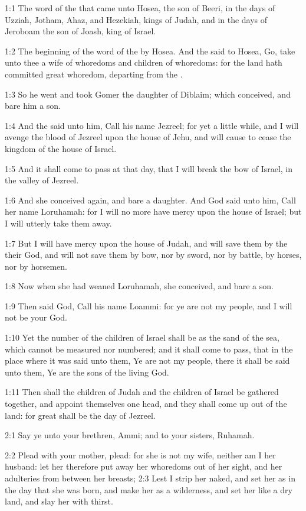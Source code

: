 

1:1 The word of the \LORD that came unto Hosea, the son of Beeri, in
the days of Uzziah, Jotham, Ahaz, and Hezekiah, kings of Judah, and in
the days of Jeroboam the son of Joash, king of Israel.

1:2 The beginning of the word of the \LORD by Hosea. And the \LORD said
to Hosea, Go, take unto thee a wife of whoredoms and children of
whoredoms: for the land hath committed great whoredom, departing from
the \LORD.

1:3 So he went and took Gomer the daughter of Diblaim; which
conceived, and bare him a son.

1:4 And the \LORD said unto him, Call his name Jezreel; for yet a
little while, and I will avenge the blood of Jezreel upon the house of
Jehu, and will cause to cease the kingdom of the house of Israel.

1:5 And it shall come to pass at that day, that I will break the bow
of Israel, in the valley of Jezreel.

1:6 And she conceived again, and bare a daughter. And God said unto
him, Call her name Loruhamah: for I will no more have mercy upon the
house of Israel; but I will utterly take them away.

1:7 But I will have mercy upon the house of Judah, and will save them
by the \LORD their God, and will not save them by bow, nor by sword,
nor by battle, by horses, nor by horsemen.

1:8 Now when she had weaned Loruhamah, she conceived, and bare a son.

1:9 Then said God, Call his name Loammi: for ye are not my people, and
I will not be your God.

1:10 Yet the number of the children of Israel shall be as the sand of
the sea, which cannot be measured nor numbered; and it shall come to
pass, that in the place where it was said unto them, Ye are not my
people, there it shall be said unto them, Ye are the sons of the
living God.

1:11 Then shall the children of Judah and the children of Israel be
gathered together, and appoint themselves one head, and they shall
come up out of the land: for great shall be the day of Jezreel.

2:1 Say ye unto your brethren, Ammi; and to your sisters, Ruhamah.

2:2 Plead with your mother, plead: for she is not my wife, neither am
I her husband: let her therefore put away her whoredoms out of her
sight, and her adulteries from between her breasts; 2:3 Lest I strip
her naked, and set her as in the day that she was born, and make her
as a wilderness, and set her like a dry land, and slay her with
thirst.


